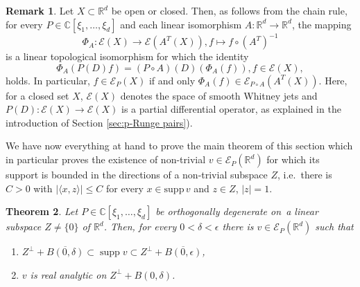 \documentclass[a4paper,10pt]{amsart}
\newtheorem{theorem}{Theorem}
\newtheorem*{crucial lemma}{Lemma \ref{lem:nice polynomial2}}
\theoremstyle{definition}
\newtheorem{remark}[theorem]{Remark}
\newcommand{\R}{\mathbb{R}}
\newcommand{\C}{\mathbb{C}}
\newcommand{\supp}{\mbox{supp}\,}
\newcommand{\veryniceon}[1]{orthogonally degenerate on~#1}
\begin{document}
\begin{remark}\label{rem:nice polynomial}
Let $X\subset\R^d$ be open or closed. Then, as follows from the chain rule, for every $P\in\C[\xi_1,\ldots,\xi_d]$ and each linear isomorphism $A\colon\R^d\rightarrow\R^d$, the mapping
		\[\Phi_A:\mathscr{E}(X)\rightarrow\mathscr{E}(A^T(X)),f\mapsto f\circ (A^T)^{-1}\]
is a linear topological isomorphism for which the identity
		\[\Phi_A\left(P(D)f\right)=(P\circ A)(D)\left(\Phi_A(f)\right), f\in\mathscr{E}(X),\] 
holds. In particular, $f\in\mathscr{E}_P(X)$ if and only $\Phi_A(f)\in\mathscr{E}_{P\circ A}(A^T(X))$. Here, for a closed set $X$, $\mathscr{E}(X)$ denotes the space of smooth Whitney jets and $P(D)\colon\mathscr{E}(X)\to\mathscr{E}(X)$ is a partial differential operator, as explained in the introduction of Section \ref{sec:p-Runge pairs}).
\end{remark}

We have now everything at hand to prove the main theorem of this section which in particular proves the existence of non-trivial $v\in\mathscr{E}_P(\R^d)$ for which its support is bounded in the directions of a non-trivial subspace $Z$, i.e.~there is $C>0$ with $|\langle x,z\rangle|\leq C$ for every $x\in\supp v$ and $z\in Z$, $|z|=1$.

\begin{theorem}\label{th:zero solution}
	Let $P\in\C[\xi_1,\ldots,\xi_d]$ be \veryniceon{a linear subspace $Z\neq\{0\}$ of $\R^d$}. Then, for every $0<\delta<\epsilon$ there is $v\in\mathscr{E}_P(\R^d)$ such that
	\begin {enumerate}[{\upshape(i)}]
	\item $Z^\perp+\overline{B(0,\delta)}\subset\operatorname{supp} v\subset Z^\perp+\overline{B(0,\epsilon)}$,
	\item $v$ is real analytic on $Z^\perp+B(0,\delta)$.
	\end{enumerate} 
\end{theorem}
\end{document}
